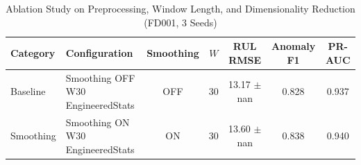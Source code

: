 \begin{table}[htbp]
\centering
\small
\caption{Ablation Study on Preprocessing, Window Length, and Dimensionality Reduction (FD001, 3 Seeds)}
\label{tab:ablation_studies}
\begin{tabular}{llccccc}
\toprule
\textbf{Category} & \textbf{Configuration} & \textbf{Smoothing} & \textbf{$W$} & \textbf{RUL RMSE} & \textbf{Anomaly F1} & \textbf{PR-AUC} \\
\midrule
Baseline & Smoothing OFF W30 EngineeredStats & OFF & 30 & 13.17 $\pm$ nan & 0.828 & 0.937 \\
Smoothing & Smoothing ON W30 EngineeredStats & ON & 30 & 13.60 $\pm$ nan & 0.838 & 0.940 \\
\bottomrule
\end{tabular}
\end{table}
